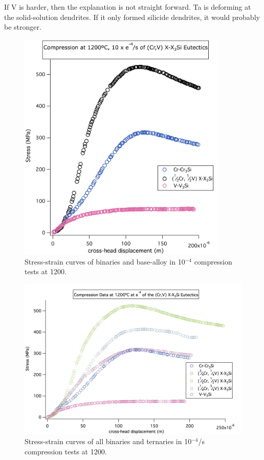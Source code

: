 If V is harder, then the explanation is not straight forward.  Ta is deforming at the solid-solution dendrites. If it only formed silicide dendrites, it would probably be stronger.

%
\begin{figure}[H]
\begin{center}
\includegraphics[width=10cm]{graph1_1}
\caption{Stress-strain curves of binaries and base-alloy  in 10$^{-4}$ compression tests at 1200\celsius.}
\label{fig:graph1_1}
\end{center}
\end{figure}
%
%
\begin{figure}[H]
\begin{center}
\includegraphics[width=14cm]{1200e-4qq}
\caption{Stress-strain curves of all binaries and ternaries in 10$^{-4}$/s compression tests at 1200\celsius.}
\label{fig:1200e-4qq}
\end{center}
\end{figure}
